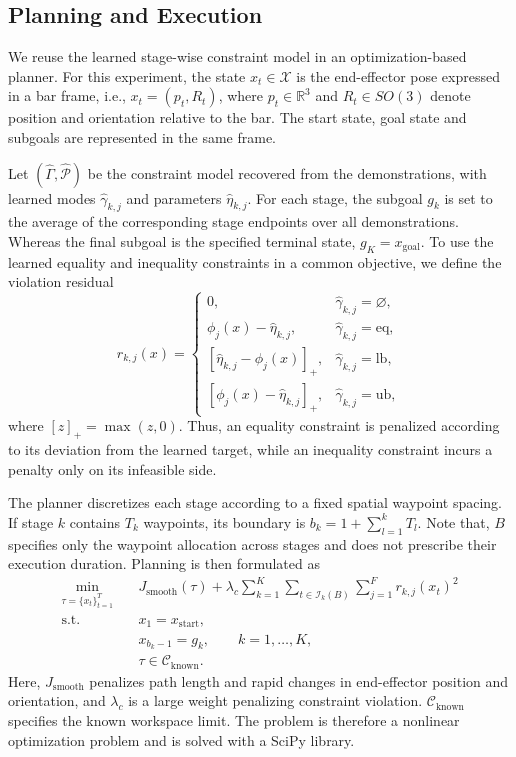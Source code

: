 \documentclass[lettersize,journal]{IEEEtran}
\begin{document}
\subsection{Planning and Execution}
We reuse the learned stage-wise constraint model in an optimization-based planner. For this experiment, the state $x_t\in\mathcal{X}$ is the end-effector pose expressed in a bar frame, i.e., $x_t=(p_t,R_t)$, where $p_t\in\mathbb{R}^3$ and $R_t\in SO(3)$ denote position and orientation relative to the bar. The start state, goal state and subgoals are represented in the same frame.

Let $(\widehat{\Gamma},\widehat{\mathcal{P}})$ be the constraint model recovered from the demonstrations, with learned modes $\widehat{\gamma}_{k,j}$ and parameters $\widehat{\eta}_{k,j}$. For each stage, the subgoal $g_k$ is set to the average of the corresponding stage endpoints over all demonstrations. Whereas the final subgoal is the specified terminal state, $g_K=x_{\mathrm{goal}}$. To use the learned equality and inequality constraints in a common objective, we define the violation residual
\begin{equation}
r_{k,j}(x)=
\begin{cases}
0, & \widehat{\gamma}_{k,j}=\varnothing,\\
\phi_j(x)-\widehat{\eta}_{k,j}, & \widehat{\gamma}_{k,j}=\mathrm{eq},\\
\left[\widehat{\eta}_{k,j}-\phi_j(x)\right]_+, & \widehat{\gamma}_{k,j}=\mathrm{lb},\\
\left[\phi_j(x)-\widehat{\eta}_{k,j}\right]_+, & \widehat{\gamma}_{k,j}=\mathrm{ub},
\end{cases}
\label{eq:barclear_constraint_residual}
\end{equation}
where $[z]_+=\max(z,0)$. Thus, an equality constraint is penalized according to its deviation from the learned target, while an inequality constraint incurs a penalty only on its infeasible side.

The planner discretizes each stage according to a fixed spatial waypoint spacing. If stage $k$ contains $T_k$ waypoints, its boundary is $b_k=1+\sum_{l=1}^{k}T_l$. Note that, $B$ specifies only the waypoint allocation across stages and does not prescribe their execution duration. Planning is then formulated as
\begin{equation}
\begin{aligned}
\min_{\tau=\{x_t\}_{t=1}^{T}}\quad
& J_{\mathrm{smooth}}(\tau)
+\lambda_c\sum_{k=1}^{K}\sum_{t\in\mathcal{I}_k(B)}\sum_{j=1}^{F}r_{k,j}(x_t)^2 \\
\mathrm{s.t.}\quad
& x_1=x_{\mathrm{start}},\\
& x_{b_k-1}=g_k, \qquad k=1,\dots,K,\\
& \tau\in\mathcal{C}_{\mathrm{known}}.
\end{aligned}
\label{eq:barclear_trajectory_optimization}
\end{equation}
Here, $J_{\mathrm{smooth}}$ penalizes path length and rapid changes in end-effector position and orientation, and $\lambda_c$ is a large weight penalizing constraint violation. $\mathcal{C}_{\mathrm{known}}$ specifies the known workspace limit. The problem is therefore a nonlinear optimization problem and is solved with a SciPy library.
\end{document}
